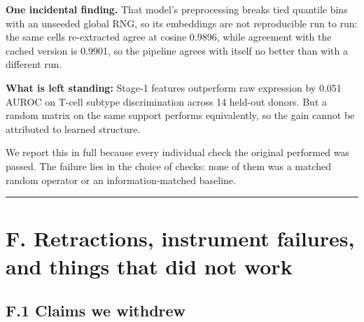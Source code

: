 \textbf{One incidental finding.} That model's preprocessing breaks tied quantile bins with an unseeded global
RNG, so its embeddings are not reproducible run to run: the same cells re-extracted agree at cosine
0.9896, while agreement with the cached version is 0.9901, so the pipeline agrees with itself no better
than with a different run.

\textbf{What is left standing:} Stage-1 features outperform raw expression by 0.051 AUROC on T-cell subtype
discrimination across 14 held-out donors. But a random matrix on the same support performs
equivalently, so the gain cannot be attributed to learned structure.

We report this in full because every individual check the original performed was passed. The failure
lies in the choice of checks: none of them was a matched random operator or an information-matched
baseline.

\begin{center}\rule{0.5\linewidth}{0.5pt}\end{center}

\hypertarget{f.-retractions-instrument-failures-and-things-that-did-not-work}{%
\section{F. Retractions, instrument failures, and things that did not work}\label{f.-retractions-instrument-failures-and-things-that-did-not-work}}

\hypertarget{f.1-claims-we-withdrew}{%
\subsection{F.1 Claims we withdrew}\label{f.1-claims-we-withdrew}}

